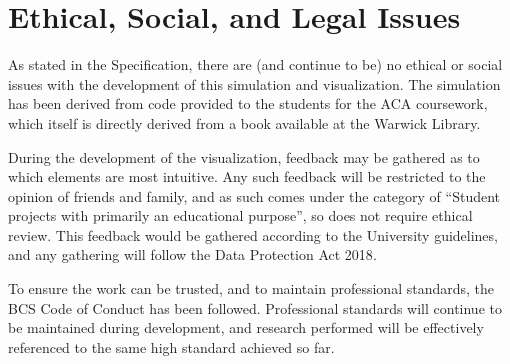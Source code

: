 
\chapter{Ethical, Social, and Legal Issues}
\label{sec:EthicalSocialLegal} 
As stated in the Specification, there are (and continue to be) no ethical or social issues with the development of this simulation and visualization.
The simulation has been derived from code provided to the students for the ACA coursework\cite{modules:CS257Coursework}, which itself is directly derived from a book\cite{book:griebel1998numerical} available at the Warwick Library\cite{ethics:WarwickLibraryFluidSimBook}.

During the development of the visualization, feedback may be gathered as to which elements are most intuitive.
Any such feedback will be restricted to the opinion of friends and family, and as such comes under the category of ``Student projects with primarily an educational purpose''\cite{UniversityofWarwickEthicalConsent}, so does not require ethical review.
This feedback would be gathered according to the University guidelines\cite{ethics:WarwickConsent}, and any gathering will follow the Data Protection Act 2018\cite{ethics:DataProtection2018}.

To ensure the work can be trusted, and to maintain professional standards, the BCS Code of Conduct\cite{ethics:BCSCodeOfConduct} has been followed.
Professional standards will continue to be maintained during development, and research performed will be effectively referenced to the same high standard achieved so far.

